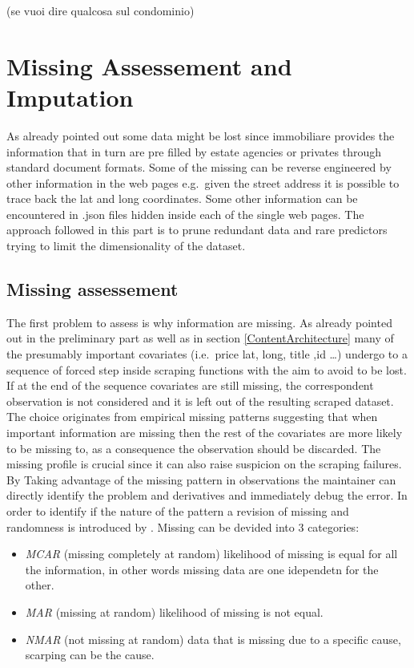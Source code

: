 \documentclass[
  12pt,
  a4paper,
  oneside]{book}
\providecommand{\tightlist}{%
  \setlength{\itemsep}{0pt}\setlength{\parskip}{0pt}}
\theoremstyle{definition}
\theoremstyle{definition}
\theoremstyle{definition}
\theoremstyle{remark}
\begin{document}
(se vuoi dire qualcosa sul condominio)

\hypertarget{missing-assessement-and-imputation}{%
\section{Missing Assessement and Imputation}\label{missing-assessement-and-imputation}}

As already pointed out some data might be lost since immobiliare provides the information that in turn are pre filled by estate agencies or privates through standard document formats. Some of the missing can be reverse engineered by other information in the web pages e.g.~given the street address it is possible to trace back the lat and long coordinates. Some other information can be encountered in .json files hidden inside each of the single web pages.
The approach followed in this part is to prune redundant data and rare predictors trying to limit the dimensionality of the dataset.

\hypertarget{missing-assessement}{%
\subsection{Missing assessement}\label{missing-assessement}}

The first problem to assess is why information are missing. As already pointed out in the preliminary part as well as in section \ref{ContentArchitecture} many of the presumably important covariates (i.e.~price lat, long, title ,id \ldots) undergo to a sequence of forced step inside scraping functions with the aim to avoid to be lost. If at the end of the sequence covariates are still missing, the correspondent observation is not considered and it is left out of the resulting scraped dataset. The choice originates from empirical missing patterns suggesting that when important information are missing then the rest of the covariates are more likely to be missing to, as a consequence the observation should be discarded.
The missing profile is crucial since it can also raise suspicion on the scraping failures. By Taking advantage of the missing pattern in observations the maintainer can directly identify the problem and derivatives and immediately debug the error. In order to identify if the nature of the pattern a revision of missing and randomness is introduced by \citet{Little}.
Missing can be devided into 3 categories:

\begin{itemize}
\tightlist
\item
  \emph{MCAR} (missing completely at random) likelihood of missing is equal for all the information, in other words missing data are one idependetn for the other.
\item
  \emph{MAR} (missing at random) likelihood of missing is not equal.
\item
  \emph{NMAR} (not missing at random) data that is missing due to a specific cause, scarping can be the cause.
\end{itemize}
\end{document}
